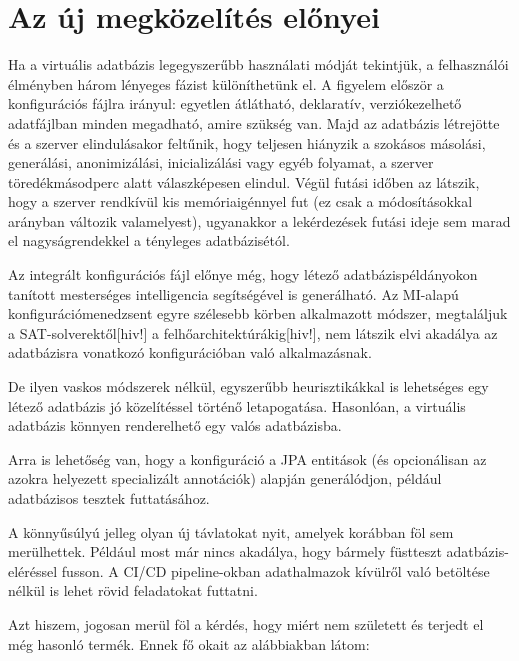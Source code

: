 \documentclass[
    parspace,
    noindent,
    nohyp,
]{elteiktdk}[2023/04/10]
\begin{document}
\section{Az új megközelítés előnyei}

Ha a virtuális adatbázis legegyszerűbb használati módját tekintjük,
a felhasználói élményben három lényeges fázist különíthetünk el.
A figyelem először a konfigurációs fájlra irányul:
egyetlen átlátható, deklaratív, verziókezelhető adatfájlban minden megadható, amire szükség van.
Majd az adatbázis létrejötte és a szerver elindulásakor feltűnik,
hogy teljesen hiányzik a szokásos másolási, generálási, anonimizálási, inicializálási vagy egyéb folyamat,
a szerver töredékmásodperc alatt válaszképesen elindul.
Végül futási időben az látszik, hogy a szerver rendkívül kis memóriaigénnyel fut
(ez csak a módosításokkal arányban változik valamelyest),
ugyanakkor a lekérdezések futási ideje sem marad el nagyságrendekkel a tényleges adatbázisétól.

Az integrált konfigurációs fájl előnye még,
hogy létező adatbázispéldányokon tanított mesterséges intelligencia segítségével is generálható.
Az MI-alapú konfigurációmenedzsent egyre szélesebb körben alkalmazott módszer,
megtaláljuk a SAT-solverektől[hiv!] a felhőarchitektúrákig[hiv!],
nem látszik elvi akadálya az adatbázisra vonatkozó konfigurációban való alkalmazásnak.

De ilyen vaskos módszerek nélkül, egyszerűbb heurisztikákkal is lehetséges
egy létező adatbázis jó közelítéssel történő letapogatása.
Hasonlóan, a virtuális adatbázis könnyen renderelhető egy valós adatbázisba.

Arra is lehetőség van, hogy a konfiguráció a JPA entitások
(és opcionálisan az azokra helyezett specializált annotációk)
alapján generálódjon, például adatbázisos tesztek futtatásához.

A könnyűsúlyú jelleg olyan új távlatokat nyit, amelyek korábban föl sem merülhettek.
Például most már nincs akadálya, hogy bármely füstteszt adatbázis-eléréssel fusson.
A CI/CD pipeline-okban adathalmazok kívülről való betöltése nélkül is lehet rövid feladatokat futtatni.

Azt hiszem, jogosan merül föl a kérdés, hogy miért nem született és terjedt el még hasonló termék.
Ennek fő okait az alábbiakban látom:
\end{document}
